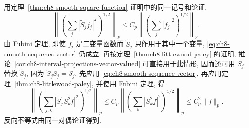 \begin{Proof}
用定理~\ref{thm:ch8-smooth-square-function} 证明中的同一记号和论证,
\begin{equation}
\label{eq:ch8-smooth-sequence-vector}
 \left\|\left(\sum_j|\widetilde S_jf_j|^2\right)^{1/2}\right\|_p
 \le C_p\left\|\left(\sum_j|f_j|^2\right)^{1/2}\right\|_p.
\end{equation}
由 Fubini 定理, 即使 $f_j$ 是二变量函数而 $\widetilde S_j$ 只作用于其中一个变量, \eqref{eq:ch8-smooth-sequence-vector} 仍成立. 再按定理~\ref{thm:ch8-littlewood-paley} 的证明, 推论~\ref{cor:ch8-interval-projections-vector-valued} 可直接用于此情形, 因而还可用 $S_j$ 替换 $\widetilde S_j$, 因为 $\widetilde S_jS_j=S_j$. 先应用 \eqref{eq:ch8-smooth-sequence-vector}, 再应用定理~\ref{thm:ch8-littlewood-paley}, 并使用 Fubini 定理, 得
\[
 \left\|\left(\sum_{j,k}|S_j^1S_k^2f|^2\right)^{1/2}\right\|_p
 \le C_p\left\|\left(\sum_k|S_k^2f|^2\right)^{1/2}\right\|_p
 \le C_p^2\|f\|_p.
\]
反向不等式由同一对偶论证得到.
\end{Proof}
